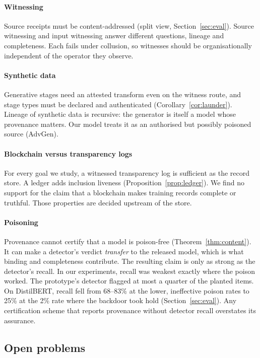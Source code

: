 \paragraph{Witnessing}
Source receipts must be content-addressed (split view, Section~\ref{sec:eval}). Source
witnessing and input witnessing answer different questions, lineage and completeness. Each
fails under collusion, so witnesses should be organisationally independent of the operator
they observe.

\paragraph{Synthetic data}
Generative stages need an attested transform even on the witness route, and stage types
must be declared and authenticated (Corollary~\ref{cor:launder}). Lineage of synthetic data
is recursive: the generator is itself a model whose provenance matters. Our model treats it
as an authorised but possibly poisoned source (\textsf{AdvGen}).

\paragraph{Blockchain versus transparency logs}
For every goal we study, a witnessed transparency log is sufficient as the record store.
A ledger adds inclusion liveness (Proposition~\ref{prop:ledger}). We find no support for
the claim that a blockchain makes training records complete or truthful. Those properties
are decided upstream of the store.

\paragraph{Poisoning}
Provenance cannot certify that a model is poison-free (Theorem~\ref{thm:content}). It can
make a detector's verdict \emph{transfer} to the released model, which is what binding and
completeness contribute. The resulting claim is only as strong as the detector's recall.
In our experiments, recall was weakest exactly where the poison worked. The prototype's detector flagged at most a quarter of the planted items. On DistilBERT, recall fell from 68--83\% at the lower, ineffective poison rates to 25\% at the 2\% rate where the backdoor took hold (Section~\ref{sec:eval}). Any
certification scheme that reports provenance without detector recall overstates its
assurance.

\subsection{Open problems}

